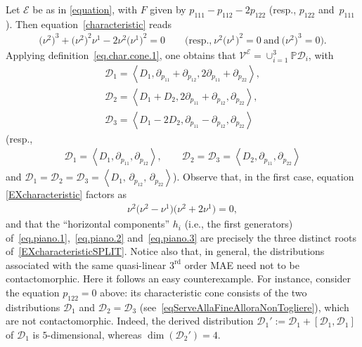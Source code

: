 \documentclass[pdftex]{sigma}
\newcommand{\D}{\mathcal{D}}
\newcommand{\M}{\mathcal{V}}
\newcommand{\E}{\mathcal{E}}
\newcommand{\Span}[1]{\left\langle #1 \right\rangle}
\renewcommand{\P}{\mathbb{P}}
\newcommand{\Rd}{^\textrm{rd}}
\newcommand{\w}{\nu}
\numberwithin{equation}{section}
\begin{document}
Let $\E$ be as in \eqref{equation}, with $F$ given by $p_{111}-p_{112}-2p_{122}$ (resp., $p_{122}$ and~$p_{111}$). Then equation~\eqref{characteristic} reads
\begin{gather}\label{EXcharacteristic}
\big(\w^2\big)^3+\big(\w^2\big)^2\w^1-2\w^2\big(\w^1\big)^2= 0\qquad \big(\textrm{resp.,} \ \w^2\big(\w^1\big)^2=0 \ \textrm{and}\ \big(\w^2\big)^3=0\big).
\end{gather}
Applying def\/inition~\eqref{eq.char.cone.1}, one obtains that $\M^\E=\cup_{i=1}^3\P\D_i$, with
\begin{gather}
\mathcal{D}_1 = \Span{ D_1 , \partial_{p_{11}}+\partial_{p_{12}}, 2\partial_{p_{11}}+\partial_{p_{22}}},\label{eq.piano.1}\\
\mathcal{D}_2 = \Span{ D_1 + D_2 ,2\partial_{p_{11}}+\partial_{p_{12}}, \partial_{p_{22}}},\label{eq.piano.2}\\
\mathcal{D}_3 = \Span{ D_1 - 2D_2 ,\partial_{p_{11}}-\partial_{p_{12}}, \partial_{p_{22}}}\label{eq.piano.3}
\end{gather}
(resp.,
 \begin{gather}
\mathcal{D}_1=\Span{ D_1,\partial_{p_{11}},\partial_{p_{12}}}, \qquad \mathcal{D}_2=\mathcal{D}_3=\Span{ D_2,\partial_{p_{11}},\partial_{p_{22}} }\label{eqServeAllaFineAlloraNonTogliere}
\end{gather}
and 
$
\mathcal{D}_1=\mathcal{D}_2=\mathcal{D}_3=\Span{ D_1,\,\partial_{p_{12}},\,\partial_{p_{22}} }
$).
Observe that, in the f\/irst case, equation \eqref{EXcharacteristic} factors as
\begin{gather}\label{EXcharacteristicSPLIT}
\w^2\big(\w^2-\w^1\big)\big(\w^2+2\w^1\big)=0,
\end{gather}
and that the ``horizontal components'' $h_i$ (i.e., the f\/irst generators) of~\eqref{eq.piano.1},~\eqref{eq.piano.2} and~\eqref{eq.piano.3} are precisely the three distinct roots of~\eqref{EXcharacteristicSPLIT}. Notice also that,
 in general, the distributions associated with the same quasi-linear $3\Rd$ order MAE need not to be contactomorphic. Here it follows an easy counterexample. For instance,
consider the equation $p_{122}=0$ above: its characteristic cone consists of the two distributions $\D_1$ and $\D_2=\D_3$ (see~\eqref{eqServeAllaFineAlloraNonTogliere}),
which are not contactomorphic. Indeed, the derived distribution $\D_1':=\D_1+[\D_1,\D_1]$ of $\D_1$ is $5$-dimensional, whereas $\dim(\D_2')=4$.
\end{document}
